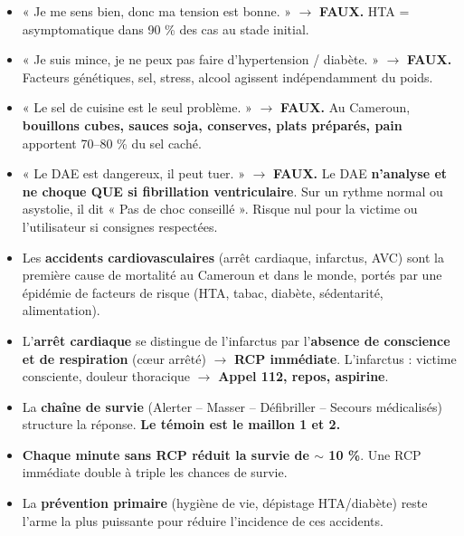 \documentclass[11pt]{article}
\newcounter{popsec}
\newcounter{popsub}
\newcommand{\courssub}[1]{%
  \stepcounter{popsub}%
  \par\vspace{9pt}\noindent{\popxbold\fontsize{11.5}{13}\selectfont\color{popink}{\color{poporange}\thepopsec.\thepopsub}\hspace{6pt}#1}\par\nopagebreak\vspace{4pt}
}
\begin{document}
\begin{attention}
\begin{itemize}
    \item « Je me sens bien, donc ma tension est bonne. » $\rightarrow$ \textbf{FAUX.} HTA = asymptomatique dans 90 \% des cas au stade initial.
    \item « Je suis mince, je ne peux pas faire d'hypertension / diabète. » $\rightarrow$ \textbf{FAUX.} Facteurs génétiques, sel, stress, alcool agissent indépendamment du poids.
    \item « Le sel de cuisine est le seul problème. » $\rightarrow$ \textbf{FAUX.} Au Cameroun, \textbf{bouillons cubes, sauces soja, conserves, plats préparés, pain} apportent 70--80 \% du sel caché.
    \item « Le DAE est dangereux, il peut tuer. » $\rightarrow$ \textbf{FAUX.} Le DAE \textbf{n'analyse et ne choque QUE si fibrillation ventriculaire}. Sur un rythme normal ou asystolie, il dit « Pas de choc conseillé ». Risque nul pour la victime ou l'utilisateur si consignes respectées.
\end{itemize}
\end{attention}

\courssub{Synthèse de la section 1}

\begin{itemize}
    \item Les \textbf{accidents cardiovasculaires} (arrêt cardiaque, infarctus, AVC) sont la première cause de mortalité au Cameroun et dans le monde, portés par une épidémie de facteurs de risque (HTA, tabac, diabète, sédentarité, alimentation).
    \item L'\textbf{arrêt cardiaque} se distingue de l'infarctus par l'\textbf{absence de conscience et de respiration} (cœur arrêté) $\rightarrow$ \textbf{RCP immédiate}. L'infarctus : victime consciente, douleur thoracique $\rightarrow$ \textbf{Appel 112, repos, aspirine}.
    \item La \textbf{chaîne de survie} (Alerter -- Masser -- Défibriller -- Secours médicalisés) structure la réponse. \textbf{Le témoin est le maillon 1 et 2.}
    \item \textbf{Chaque minute sans RCP réduit la survie de $\sim$ 10 \%}. Une RCP immédiate double à triple les chances de survie.
    \item La \textbf{prévention primaire} (hygiène de vie, dépistage HTA/diabète) reste l'arme la plus puissante pour réduire l'incidence de ces accidents.
\end{itemize}
\end{document}
